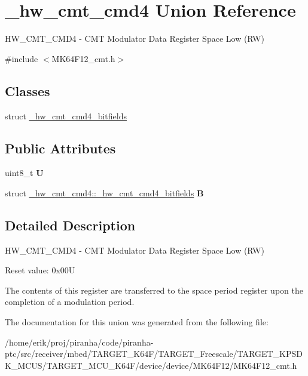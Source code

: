 \hypertarget{union__hw__cmt__cmd4}{}\section{\+\_\+hw\+\_\+cmt\+\_\+cmd4 Union Reference}
\label{union__hw__cmt__cmd4}


H\+W\+\_\+\+C\+M\+T\+\_\+\+C\+M\+D4 -\/ C\+MT Modulator Data Register Space Low (RW)  




{\ttfamily \#include $<$M\+K64\+F12\+\_\+cmt.\+h$>$}

\subsection*{Classes}
\begin{DoxyCompactItemize}
\item 
struct \hyperlink{struct__hw__cmt__cmd4_1_1__hw__cmt__cmd4__bitfields}{\+\_\+hw\+\_\+cmt\+\_\+cmd4\+\_\+bitfields}
\end{DoxyCompactItemize}
\subsection*{Public Attributes}
\begin{DoxyCompactItemize}
\item 
uint8\+\_\+t {\bfseries U}\hypertarget{union__hw__cmt__cmd4_aaced0b744a41cd7b87899240a4fce95a}{}\label{union__hw__cmt__cmd4_aaced0b744a41cd7b87899240a4fce95a}

\item 
struct \hyperlink{struct__hw__cmt__cmd4_1_1__hw__cmt__cmd4__bitfields}{\+\_\+hw\+\_\+cmt\+\_\+cmd4\+::\+\_\+hw\+\_\+cmt\+\_\+cmd4\+\_\+bitfields} {\bfseries B}\hypertarget{union__hw__cmt__cmd4_a0c06a405338878f597c8631f02983ce1}{}\label{union__hw__cmt__cmd4_a0c06a405338878f597c8631f02983ce1}

\end{DoxyCompactItemize}


\subsection{Detailed Description}
H\+W\+\_\+\+C\+M\+T\+\_\+\+C\+M\+D4 -\/ C\+MT Modulator Data Register Space Low (RW) 

Reset value\+: 0x00U

The contents of this register are transferred to the space period register upon the completion of a modulation period. 

The documentation for this union was generated from the following file\+:\begin{DoxyCompactItemize}
\item 
/home/erik/proj/piranha/code/piranha-\/ptc/src/receiver/mbed/\+T\+A\+R\+G\+E\+T\+\_\+\+K64\+F/\+T\+A\+R\+G\+E\+T\+\_\+\+Freescale/\+T\+A\+R\+G\+E\+T\+\_\+\+K\+P\+S\+D\+K\+\_\+\+M\+C\+U\+S/\+T\+A\+R\+G\+E\+T\+\_\+\+M\+C\+U\+\_\+\+K64\+F/device/device/\+M\+K64\+F12/M\+K64\+F12\+\_\+cmt.\+h\end{DoxyCompactItemize}
